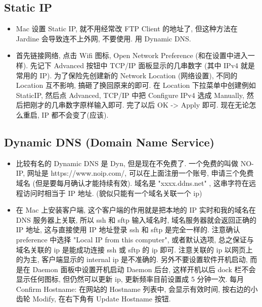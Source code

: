 \subsection{Static IP}
\begin{itemize}
\item Mac 设置 Static IP, 就不用经常改 FTP Client 的地址了, 但这种方法在 Jardine 会导致连不上外网, 不要使用. 用 Dynamic DNS.
\item 首先链接网络, 点击 Wifi 图标, Open Network Preference (和在设置中进入一样). 先记下 Advanced 按钮中 TCP/IP 面板显示的几串数字 (其中 IPv4 就是常用的 IP). 为了保险先创建新的 Network Location (网络设置), 不同的 Location 互不影响, 搞砸了换回原来的即可. 在 Location 下拉菜单中创建例如 StaticIP, 然后点 Advanced, TCP/IP 中把 Configure IPv4 选成 Manually, 然后把刚才的几串数字原样输入即可. 完了以后 OK -> Apply 即可. 现在无论怎么重启, IP 都不会变了(应该).
\end{itemize}

\subsection{Dynamic DNS (Domain Name Service)}
\begin{itemize}
\item 比较有名的 Dynamic DNS 是 Dyn, 但是现在不免费了. 一个免费的叫做 NO-IP, 网址是 https://www.noip.com/, 可以在上面注册一个账号, 申请三个免费域名 (但是要每月确认才能持续有效).  域名是 "xxxx.ddns.net"  , 这串字符在远程访问时相当于 IP 地址. (貌似只能有一个域名关联一个 ip)

\item 在 Mac 上安装客户端, 这个客户端的作用就是把本地的 IP 实时和我的域名在 DNS 服务器上关联, 所以 ssh 和 sftp 输入域名时, 域名服务器就会返回正确的 IP 地址, 这与直接使用 IP 地址登录 ssh 和 sftp 是完全一样的.
注意确认 preference 中选择 "Local IP from this computer", 或者默认选项, 总之保证与域名关联的 ip 是能成功连接 ssh 或 sftp 的 ip 即可. 注意关联的 ip 以网页上的为主, 客户端显示的 internal ip 是不准确的.
另外不要设置软件开机启动, 而是在 Daemon 面板中设置开机启动 Daemon 后台, 这样开机以后 dock 栏不会显示任何图标, 但仍然可以更新 ip, 更新频率目前设置成 5 分钟一次.
每月 Confirm Hostname: 在网站的 Hostname 列表中, 会显示有效时间, 按右边的小齿轮 Modify, 在右下角有 Update Hostname 按钮.
\end{itemize}
